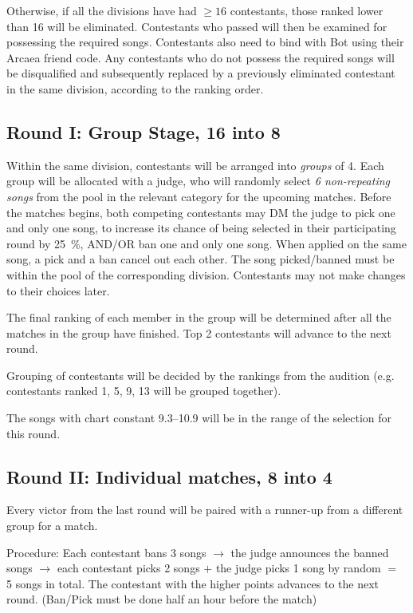 \documentclass{article}
\newcommand{\alert}[1]{{\color{red} #1}}
\begin{document}
Otherwise, if all the divisions have had $\geq 16$ contestants,
those ranked lower than 16 will be eliminated.
Contestants who passed will then be examined for
possessing the required songs.
Contestants also need to bind with Bot
using their Arcaea friend code.
Any contestants who do not possess the required songs
will be disqualified and subsequently
replaced by a previously eliminated
contestant in the same division,
according to the ranking order.

\subsection{Round I: Group Stage, 16 into 8}

Within the same division,
contestants will be arranged into \emph{groups} of 4.
Each group will be allocated with a judge,
who will randomly select \emph{6 non-repeating songs}
from the pool in the relevant category
for the upcoming matches.
Before the matches begins,
both competing contestants
may DM the judge to pick one and only one song,
to increase its chance of being selected
in their participating round by \qty{25}{\percent},
AND/OR ban one and only one song.
When applied on the same song,
a pick and a ban cancel out each other.
The song picked/banned must be within
the pool of the corresponding division.
Contestants may not make changes to their choices later.

The final ranking of each member in the group will be determined
after all the matches in the group have finished.
Top 2 contestants will advance to the next round.

Grouping of contestants will be decided
by the rankings from the audition
(e.g. contestants ranked 1, 5, 9, 13
will be grouped together).

\alert{
	The songs with chart constant 9.3--10.9
	will be in the range of the selection for this round.
}

\subsection{Round II: Individual matches, 8 into 4}

Every victor from the last round
will be paired with a runner-up
from a different group for a match.

Procedure: Each contestant bans 3 songs $\rightarrow$
the judge announces the banned songs $\rightarrow$
each contestant picks 2 songs $+$ the judge picks 1 song by random $=$ 5 songs in total.
The contestant with the higher points advances to the next round.
(Ban/Pick must be done half an hour before the match)
\end{document}
